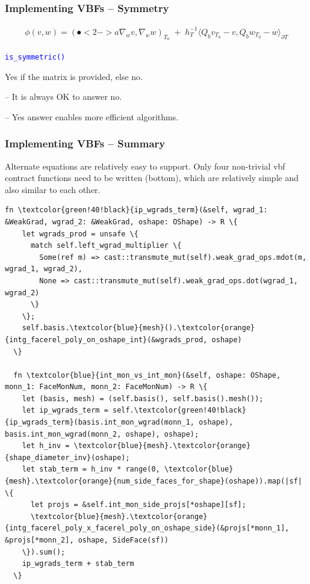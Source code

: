 \documentclass[compress]{beamer}
\begin{document}
\begin{frame}
  \frametitle{Implementing VBFs -- Symmetry}
  \begin{align*}
    \mathfrak \phi(v,w) = (\spot<2->{a} \nabla_w v,\nabla_w w)_{\scriptscriptstyle T_0} \;+\;
    h_T^{-1}\langle Q_b v_{\scriptscriptstyle T_0} - v,Q_b w_{\scriptscriptstyle T_0} - w \rangle_{\partial T}
  \end{align*}
  
  \texttt{\small \textcolor{blue}{is\_symmetric()}}\\
 
  \pause
  \uncover<+-> {
  \vspace{0.5cm}
  Yes if the matrix  is provided, else no.
 
  \uncover<+-> {
  \vspace{0.3cm}
  -- It is always OK to answer no.
  
  \uncover<+-> {
  \vspace{0.3cm}
  -- Yes answer enables more efficient algorithms.
  }}}
\end{frame}

\begin{frame}[fragile]
  \frametitle{Implementing VBFs -- Summary}
  \uncover<+-> {
  Alternate equations are relatively easy to support. Only four non-trivial vbf contract functions need to be written (bottom),
  which are relatively simple and also similar to each other.\\
  }
  \begin{Verbatim}[gobble=2, commandchars=\\\{\}, fontsize=\tiny, fontfamily=tt]
  fn \textcolor{green!40!black}{ip_wgrads_term}(&self, wgrad_1: &WeakGrad, wgrad_2: &WeakGrad, oshape: OShape) -> R \{
    let wgrads_prod = unsafe \{
      match self.left_wgrad_multiplier \{
        Some(ref m) => cast::transmute_mut(self).weak_grad_ops.mdot(m, wgrad_1, wgrad_2),
        None => cast::transmute_mut(self).weak_grad_ops.dot(wgrad_1, wgrad_2)
      \}
    \};
    self.basis.\textcolor{blue}{mesh}().\textcolor{orange}{intg_facerel_poly_on_oshape_int}(&wgrads_prod, oshape)
  \}

  fn \textcolor{blue}{int_mon_vs_int_mon}(&self, oshape: OShape, monn_1: FaceMonNum, monn_2: FaceMonNum) -> R \{
    let (basis, mesh) = (self.basis(), self.basis().mesh());
    let ip_wgrads_term = self.\textcolor{green!40!black}{ip_wgrads_term}(basis.int_mon_wgrad(monn_1, oshape), basis.int_mon_wgrad(monn_2, oshape), oshape);
    let h_inv = \textcolor{blue}{mesh}.\textcolor{orange}{shape_diameter_inv}(oshape);
    let stab_term = h_inv * range(0, \textcolor{blue}{mesh}.\textcolor{orange}{num_side_faces_for_shape}(oshape)).map(|sf| \{
      let projs = &self.int_mon_side_projs[*oshape][sf];
      \textcolor{blue}{mesh}.\textcolor{orange}{intg_facerel_poly_x_facerel_poly_on_oshape_side}(&projs[*monn_1], &projs[*monn_2], oshape, SideFace(sf))
    \}).sum();
    ip_wgrads_term + stab_term
  \}
  \end{Verbatim}
\end{frame}

  
\end{document}
